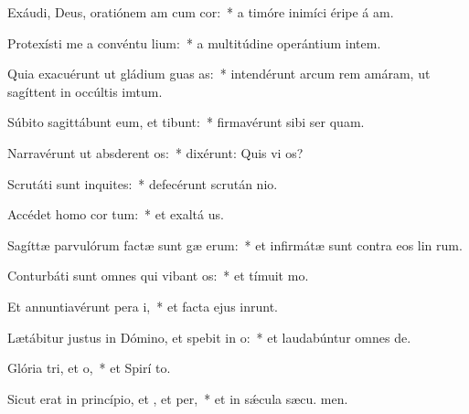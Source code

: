 \item Exáudi, Deus, oratiónem am cum cor:~* a timóre inimíci éripe á am.
\item Protexísti me a convéntu lium:~* a multitúdine operántium intem.
\item Quia exacuérunt ut gládium guas as:~* intendérunt arcum rem amáram, ut sagíttent in occúltis imtum.
\item Súbito sagittábunt eum, et  tibunt:~* firmavérunt sibi ser quam.
\item Narravérunt ut absderent os:~* dixérunt: Quis vi os?
\item Scrutáti sunt inquites:~* defecérunt scrután nio.
\item Accédet homo  cor tum:~* et exaltá us.
\item Sagíttæ parvulórum factæ sunt gæ erum:~* et infirmátæ sunt contra eos lin rum.
\item Conturbáti sunt omnes qui vibant os:~* et tímuit  mo.
\item Et annuntiavérunt pera i,~* et facta ejus inrunt.
\item Lætábitur justus in Dómino, et spebit in o:~* et laudabúntur omnes  de.
\item Glória tri, et o,~* et Spirí to.
\item Sicut erat in princípio, et , et per,~* et in sǽcula sæcu. men.

